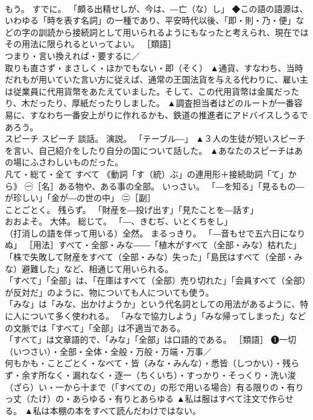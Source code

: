 \documentclass[8pt]{extreport}
\begin{document}
\begin{CJK}{UTF8}{min}
\\	もう。 すでに。 「頗る出精せしが、今は、―亡（な）し」 ◆この語の語源は、いわゆる「時を表す名詞」の一種であり、平安時代以後、「即・則・乃・便」などの字の訓読から接続詞として用いられるようにもなったと考えられ、現在ではその用法に限られるといってよい。 ［類語］ 
\\	つまり・言い換えれば・要するに／
\\	取りも直さず・まさしく・ほかでもない・即（そく）	▲通貨、すなわち、当時だれもが用いていた言い方に従えば、通常の王国法貨を与える代わりに、雇い主は従業員に代用貨幣をあたえていました。そして、この代用貨幣は金属だったり、木だったり、厚紙だったりしました。 ▲調査担当者はどのルートが一番容易に、すなわち一番安上がりに作れるかも、鉄道の推進者にアドバイスしうるであろう。
\\	スピーチ	スピーチ	談話。 演説。 「テーブル―」	▲３人の生徒が短いスピーチを言い、自己紹介をしたり自分の国について話した。 ▲あなたのスピーチはあの場にふさわしいものだった。
\\	凡て・総て・全て	すべて	《動詞「す（統）ぶ」の連用形＋接続助詞「て」から》 ㊀［名］ある物や、ある事の全部。 いっさい。 「―を知る」「見るもの―が珍しい」「金が―の世の中」 ㊁［副］ 
\\	ことごとく。 残らず。 「財産を―投げ出す」「見たことを―話す」 
\\	おおよそ。 大体。 総じて。 「―、きむぢ、いとくちをし」 
\\	（打消しの語を伴って用いる）全然。 まるっきり。 「―音もせで五六日になりぬ」 ［用法］すべて・全部・みな――「植木がすべて（全部・みな）枯れた」「株で失敗して財産をすべて（全部・みな）失った」「島民はすべて（全部・みな）避難した」など、相通じて用いられる。 
\\	「すべて」「全部」は、「在庫はすべて（全部）売り切れた」「会員すべて（全部）が反対だ」のように、物についても人についても使う。 
\\	「みな」は「みな、出かけようか」という代名詞としての用法があるように、特に人について多く使われる。 「みなで協力しよう」「みな帰ってしまった」などの文脈では「すべて」「全部」は不適当である。 
\\	「すべて」は文章語的で、「みな」「全部」は口語的である。 ［類語］ ❶一切（いつさい）・全部・全体・全般・万般・万端・万事／ 
\\	何もかも・ことごとく・なべて・皆（みな・みんな）・悉皆（しつかい）・残らず・余す所なく・漏れなく・逐一（ちくいち）・すっかり・そっくり・洗い浚（ざら）い・一から十まで（「すべての」の形で用いる場合）有る限りの・有りっ丈（たけ）の・あらゆる・有りとあらゆる	▲私は服はすべて注文で作らせる。 ▲私は本棚の本をすべて読んだわけではない。

\end{CJK}
\end{document}
